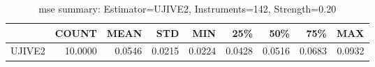 \begin{table}[ht]
\centering
\caption{mse summary: Estimator=UJIVE2, Instruments=142, Strength=0.20}
\begin{tabular}{lrrrrrrrr}
\toprule
 & COUNT & MEAN & STD & MIN & 25\% & 50\% & 75\% & MAX \\
\midrule
UJIVE2 & 10.0000 & 0.0546 & 0.0215 & 0.0224 & 0.0428 & 0.0516 & 0.0683 & 0.0932 \\
\bottomrule
\end{tabular}
\end{table}
